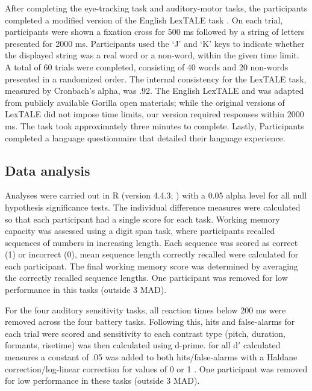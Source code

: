 After completing the eye-tracking task and auditory-motor tasks, the participants completed a modified version of the English LexTALE task \citep{lemhofer2012introducing}. On each trial, participants were shown a fixation cross for 500 ms followed by a string of letters presented for 2000 ms. Participants used the ‘J’ and ‘K’ keys to indicate whether the displayed string was a real word or a non-word, within the given time limit. A total of 60 trials were completed, consisting of 40 words and 20 non-words presented in a randomized order. The internal consistency for the LexTALE task, measured by Cronbach’s alpha, was .92. The English LexTALE and was adapted from publicly available Gorilla open materials; while the original versions of LexTALE did not impose time limits, our version required responses within 2000 ms. The task took approximately three minutes to complete. Lastly, Participants completed a language questionnaire that detailed their language experience. 


\subsection{Data analysis}

Analyses were carried out in R (version 4.4.3; \cite{R}) with a 0.05 alpha level for all null hypothesis significance tests. The individual difference measures were calculated so that each participant had a single score for each task. Working memory capacity was assessed using a digit span task, where participants recalled sequences of numbers in increasing length. Each sequence was scored as correct (1) or incorrect (0), mean sequence length correctly recalled were calculated for each participant. The final working memory score was determined by averaging the correctly recalled sequence lengths. One participant was removed for low performance in this tasks (outside 3 MAD).

For the four auditory sensitivity tasks, all reaction times below 200 ms were removed across the four battery tasks. Following this, hits and false-alarms for each trial were scored and sensitivity to each contrast type (pitch, duration, formants, risetime) was then calculated using d-prime. for all d$'$ calculated measures a constant of .05 was added to both hits/false-alarms with a Haldane correction/log-linear correction for values of 0 or 1 \citep{Hautus1995}. One participant was removed for low performance in these tasks (outside 3 MAD).

